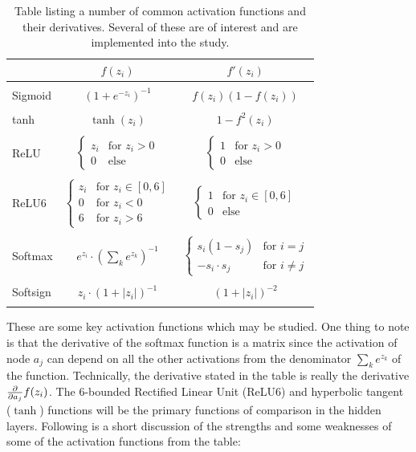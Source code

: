         \begin{table}[H]
            \centering
            \begin{tabular}[t]{l@{\hskip 0.4in}c@{\hskip 0.3in}c}
                \toprule
                 & $f(z_i)$ & $f'(z_i)$ \\
                \midrule\\
                Sigmoid & $(1+e^{-z_i})^{-1}$ & $f(z_i)\left( 1-f(z_i) \right)$ \\\\
                tanh & $\tanh (z_i)$ & $1-f^2(z_i)$ \\\\
                ReLU & $\begin{cases} z_i & \text{for } z_i>0 \\ 0 & \text{else} \end{cases}$ & $\begin{cases} 1 & \text{for } z_i>0 \\ 0 & \text{else} \end{cases}$ \\\\
                ReLU6 & $\begin{cases} z_i & \text{for } z_i\in[0,6] \\ 0 & \text{for } z_i<0 \\ 6 & \text{for } z_i>6 \end{cases}$ & $\begin{cases} 1 & \text{for } z_i\in [0,6] \\ 0 & \text{else} \end{cases}$ \\\\
                Softmax & $e^{z_i}\cdot(\sum_k e^{z_k})^{-1}$ & $\begin{cases}s_i(1-s_j) & \text{for } i=j\\ -s_i\cdot s_j & \text{for } i\neq j \end{cases}$ \\\\
                Softsign & $z_i\cdot \left( 1+|z_i| \right)^{-1}$ & $\left( 1+|z_i| \right)^{-2}$\\\\
                \bottomrule
            \end{tabular}
            \caption{Table listing a number of common activation functions and their derivatives. Several of these are of interest and are implemented into the study.}
            \label{tab:activation_functions}
        \end{table}
        These are some key activation functions which may be studied. One thing to note is that the derivative of the softmax function is a matrix since the activation of node $a_j$ can depend on all the other activations from the denominator $\sum_ke^{z_k}$ of the function. Technically, the derivative stated in the table is really the derivative $\pdv{}{a_j}f(z_i)$. The 6-bounded Rectified Linear Unit (ReLU6) and hyperbolic tangent ($\tanh$) functions will be the primary functions of comparison in the hidden layers. Following is a short discussion of the strengths and some weaknesses of some of the activation functions from the table:
